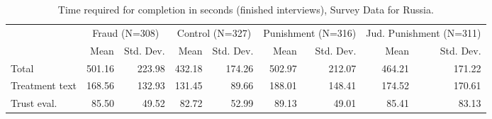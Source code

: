 \begin{table}

\caption{Time required for completion in seconds (finished interviews), Survey Data for Russia.}
\centering
\begin{tabular}[t]{lrrrrrrrr}
\toprule
\multicolumn{1}{c}{ } & \multicolumn{2}{c}{Fraud (N=308)} & \multicolumn{2}{c}{Control (N=327)} & \multicolumn{2}{c}{Punishment (N=316)} & \multicolumn{2}{c}{Jud. Punishment (N=311)} \\
\cmidrule(l{3pt}r{3pt}){2-3} \cmidrule(l{3pt}r{3pt}){4-5} \cmidrule(l{3pt}r{3pt}){6-7} \cmidrule(l{3pt}r{3pt}){8-9}
  & Mean & Std. Dev. & Mean & Std. Dev. & Mean & Std. Dev. & Mean & Std. Dev.\\
\midrule
Total & 501.16 & 223.98 & 432.18 & 174.26 & 502.97 & 212.07 & 464.21 & 171.22\\
Treatment text & 168.56 & 132.93 & 131.45 & 89.66 & 188.01 & 148.41 & 174.52 & 170.61\\
Trust eval. & 85.50 & 49.52 & 82.72 & 52.99 & 89.13 & 49.01 & 85.41 & 83.13\\
\bottomrule
\end{tabular}
\end{table}
